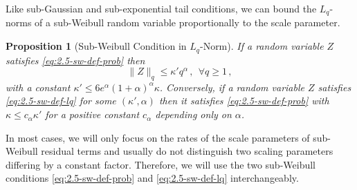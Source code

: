 \documentclass[11pt]{article}
\theoremstyle{plain}
\newtheorem{proposition}[theorem]{Proposition}
\begin{document}
Like sub-Gaussian and sub-exponential tail conditions, we can bound the $L_q$-norms of a sub-Weibull random variable proportionally to the scale parameter.
\begin{proposition}[Sub-Weibull Condition in $L_q$-Norm]\label{pro:2.5-sw-equiv}
    If a random variable $Z$ satisfies \eqref{eq:2.5-sw-def-prob} then
    \begin{equation}\label{eq:2.5-sw-def-lq}
        \|Z\|_q\le \kappa' q^\alpha\,,~~\forall q\ge 1\,,
    \end{equation}
    with a constant $\kappa'\le 6 e^\alpha(1+\alpha)^\alpha \kappa$.  Conversely, if a random variable $Z$ satisfies \eqref{eq:2.5-sw-def-lq} for some $(\kappa',\alpha)$ then it satisfies
    \eqref{eq:2.5-sw-def-prob} with $\kappa \le c_\alpha \kappa'$ for a positive constant $c_\alpha$ depending only on $\alpha$.
\end{proposition}
In most cases, we will only focus on the rates of the scale parameters of sub-Weibull residual terms and usually do not distinguish two scaling parameters differing by a constant factor. Therefore, we will use the two sub-Weibull conditions \eqref{eq:2.5-sw-def-prob} and \eqref{eq:2.5-sw-def-lq} interchangeably.  
\end{document}
